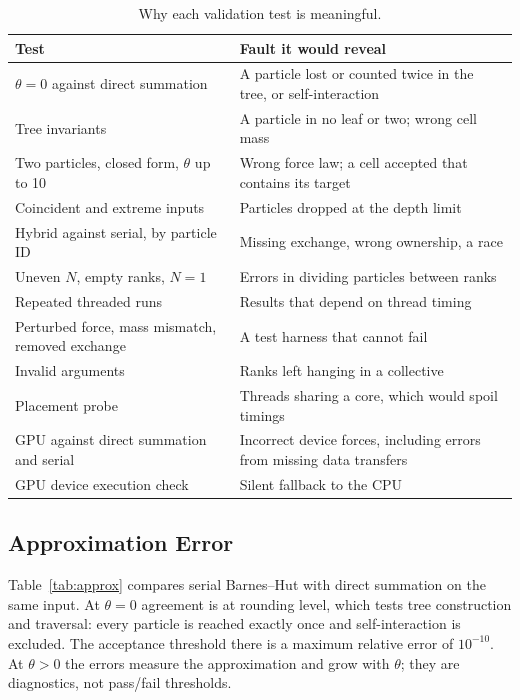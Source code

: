 \documentclass[10pt,a4paper,twocolumn,twoside]{rho-class/rho}
\begin{document}
\begin{table}[t]
\centering
\small
\caption{Why each validation test is meaningful.}
\label{tab:test-purpose}
\begin{tabular}{@{}L{0.41\columnwidth}L{0.53\columnwidth}@{}}
\toprule
Test & Fault it would reveal \\
\midrule
$\theta=0$ against direct summation & A particle lost or counted twice in the tree, or self-interaction \\
Tree invariants & A particle in no leaf or two; wrong cell mass \\
Two particles, closed form, $\theta$ up to 10 & Wrong force law; a cell accepted that contains its target \\
Coincident and extreme inputs & Particles dropped at the depth limit \\
Hybrid against serial, by particle ID & Missing exchange, wrong ownership, a race \\
Uneven $N$, empty ranks, $N=1$ & Errors in dividing particles between ranks \\
Repeated threaded runs & Results that depend on thread timing \\
Perturbed force, mass mismatch, removed exchange & A test harness that cannot fail \\
Invalid arguments & Ranks left hanging in a collective \\
Placement probe & Threads sharing a core, which would spoil timings \\
GPU against direct summation and serial & Incorrect device forces, including errors from missing data transfers \\
GPU device execution check & Silent fallback to the CPU \\
\bottomrule
\end{tabular}
\end{table}

\subsection{Approximation Error}
Table~\ref{tab:approx} compares serial Barnes--Hut with direct summation on the same input. At $\theta=0$ agreement is at rounding level, which tests tree construction and traversal: every particle is reached exactly once and self-interaction is excluded. The acceptance threshold there is a maximum relative error of $10^{-10}$. At $\theta>0$ the errors measure the approximation and grow with $\theta$; they are diagnostics, not pass/fail thresholds.
\end{document}
